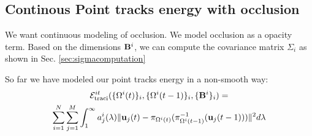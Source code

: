 \documentclass[10pt,twocolumn,letterpaper]{article}
\begin{document}

\subsection{Continous Point tracks energy with occlusion}
\label{sec:totalContPtTracksEnergy}
We want continuous modeling of occlusion. We model occlusion as a opacity
term. Based on the dimensions $\mathbf{B}^{i}$, we can
compute the covariance matrix $\Sigma_i$ as shown in Sec. 
\ref{sec:sigmacomputation}

So far we have modeled our point tracks energy in a non-smooth way:
\newcommand{\invProjectionOf}[1]{\pi^{-1}_{\relp{i}{t-1}}(#1)}
\begin{multline}
  \Energy{traci}(\{ \relp{i}{t} \}_i, \{ \relp{i}{t-1} \}_i, \{\dimsn{i}\}_i ) = \\
    \sum_{i=1}^{N} 
    \sum_{j = 1}^{M}
    \int_1^\infty a_j^i(\lambda)\|\trackpj{t} - \projectionOf{\invProjectionOf{\trackpj{t-1}}}\|^2 d\lambda
\end{multline}
\end{document}

